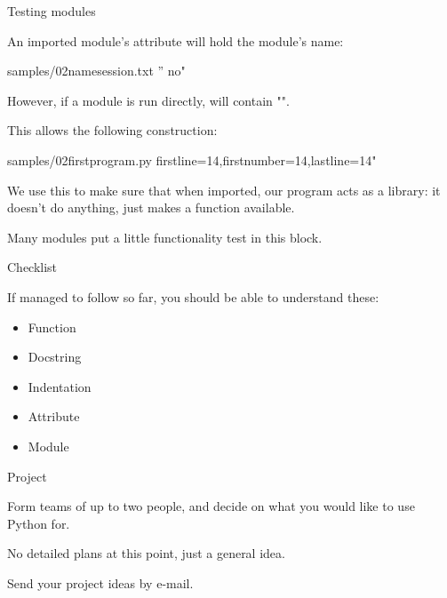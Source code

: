 \documentclass{pyslides}
\begin{document}
\begin{frame}[fragile]{Testing modules}

An imported module's {\tt{}} attribute will hold the module's name:

 samples/02namesession.txt '' no"

However, if a module is run directly, {\tt{}} will contain "".

This allows the following construction:

 samples/02firstprogram.py firstline=14,firstnumber=14,lastline=14"

We use this to make sure that when imported, our program acts as a library:
it doesn't do anything, just makes a function available.

Many modules put a little functionality test in this block.

\end{frame}

\begin{frame}[fragile]{Checklist}

If managed to follow so far, you should be able to understand these:

\begin{itemize}
\item Function
\item Docstring
\item Indentation
\item Attribute
\item Module
\end{itemize}

\end{frame}

\begin{frame}[fragile]{Project}

Form teams of up to two people, and decide on what you would like to use
Python for.

\bigskip

No detailed plans at this point, just a general idea.

Send your project ideas by e-mail.


\end{frame}
\end{document}
